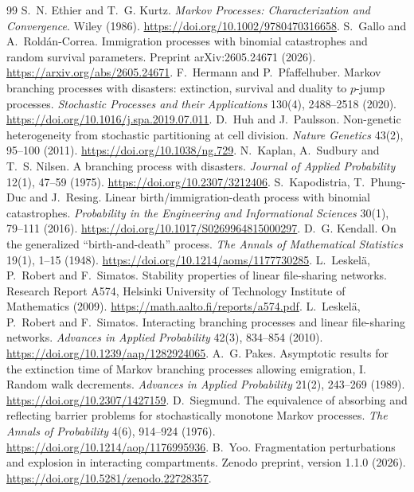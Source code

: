 \documentclass[11pt,a4paper]{article}
\numberwithin{equation}{section}
\theoremstyle{definition}\newtheorem{definition}[theorem]{Definition}
\theoremstyle{remark}\newtheorem{remark}[theorem]{Remark}\newtheorem{example}[theorem]{Example}
\begin{document}
\begin{thebibliography}{99}
 S.~N. Ethier and T.~G. Kurtz. \emph{Markov Processes: Characterization and Convergence}. Wiley (1986). \url{https://doi.org/10.1002/9780470316658}.
 S.~Gallo and A.~Rold\'an-Correa. Immigration processes with binomial catastrophes and random survival parameters. Preprint arXiv:2605.24671 (2026). \url{https://arxiv.org/abs/2605.24671}.
 F.~Hermann and P.~Pfaffelhuber. Markov branching processes with disasters: extinction, survival and duality to $p$-jump processes. \emph{Stochastic Processes and their Applications} 130(4), 2488--2518 (2020). \url{https://doi.org/10.1016/j.spa.2019.07.011}.
 D.~Huh and J.~Paulsson. Non-genetic heterogeneity from stochastic partitioning at cell division. \emph{Nature Genetics} 43(2), 95--100 (2011). \url{https://doi.org/10.1038/ng.729}.
 N.~Kaplan, A.~Sudbury and T.~S. Nilsen. A branching process with disasters. \emph{Journal of Applied Probability} 12(1), 47--59 (1975). \url{https://doi.org/10.2307/3212406}.
 S.~Kapodistria, T.~Phung-Duc and J.~Resing. Linear birth/immigration-death process with binomial catastrophes. \emph{Probability in the Engineering and Informational Sciences} 30(1), 79--111 (2016). \url{https://doi.org/10.1017/S0269964815000297}.
 D.~G. Kendall. On the generalized ``birth-and-death'' process. \emph{The Annals of Mathematical Statistics} 19(1), 1--15 (1948). \url{https://doi.org/10.1214/aoms/1177730285}.
 L.~Leskel\"a, P.~Robert and F.~Simatos. Stability properties of linear file-sharing networks. Research Report A574, Helsinki University of Technology Institute of Mathematics (2009). \url{https://math.aalto.fi/reports/a574.pdf}.
 L.~Leskel\"a, P.~Robert and F.~Simatos. Interacting branching processes and linear file-sharing networks. \emph{Advances in Applied Probability} 42(3), 834--854 (2010). \url{https://doi.org/10.1239/aap/1282924065}.
 A.~G. Pakes. Asymptotic results for the extinction time of Markov branching processes allowing emigration, I. Random walk decrements. \emph{Advances in Applied Probability} 21(2), 243--269 (1989). \url{https://doi.org/10.2307/1427159}.
 D.~Siegmund. The equivalence of absorbing and reflecting barrier problems for stochastically monotone Markov processes. \emph{The Annals of Probability} 4(6), 914--924 (1976). \url{https://doi.org/10.1214/aop/1176995936}.
 B.~Yoo. Fragmentation perturbations and explosion in interacting compartments. Zenodo preprint, version 1.1.0 (2026). \url{https://doi.org/10.5281/zenodo.22728357}.
\end{thebibliography}
\end{document}
